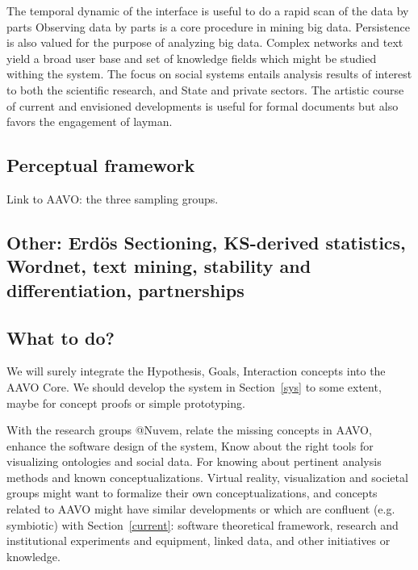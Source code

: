 \documentclass[letterpaper,10pt]{article}
\begin{document}
The temporal dynamic of the interface is useful to do a rapid scan of the data by parts
Observing data by parts is a core procedure in mining big data.
Persistence is also valued for the purpose of analyzing big data.
Complex networks and text yield a broad user base
and set of knowledge fields which might be studied withing the system.
The focus on social systems entails analysis results of interest
to both the scientific research, and State and private sectors.
The artistic course of current and envisioned developments
is useful for formal documents but also favors the engagement
of layman.

\subsection{Perceptual framework}
Link to AAVO: the three sampling groups.
\subsection{Other: Erdös Sectioning, KS-derived statistics, Wordnet,
text mining, stability and differentiation, partnerships}
\subsection{What to do?}
We will surely integrate the Hypothesis, Goals, Interaction
concepts into the AAVO Core.
We should develop the system in Section~\ref{sys} to some extent,
maybe for concept proofs or simple prototyping.

With the research groups @Nuvem, 
relate the missing concepts in AAVO,
enhance the software design of the system,
Know about the right tools for visualizing
ontologies and social data.
For knowing about pertinent analysis methods
and known conceptualizations.
Virtual reality, visualization and societal groups
might want to formalize their own conceptualizations,
and concepts related to AAVO might have similar developments
or which are confluent (e.g. symbiotic)
with Section~\ref{current}: software
theoretical framework, research and institutional experiments and equipment,
linked data, and other initiatives or knowledge.
\end{document}
